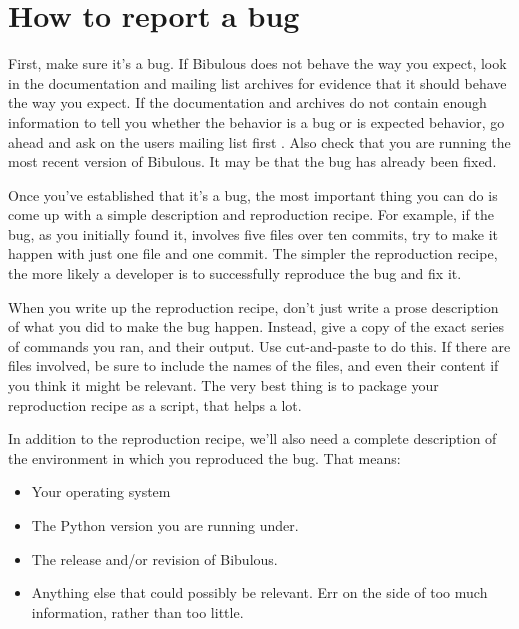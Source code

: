\documentclass[letterpaper,10pt,english]{sphinxmanual}
\begin{document}
\section{How to report a bug}
\label{instructions_for_reporting_bugs:how-to-report-a-bug}
First, make sure it's a bug. If Bibulous does not behave the way you expect, look in the documentation and mailing list archives for evidence that it should behave the way you expect. If the documentation and archives do not contain enough information to tell you whether the behavior is a bug or is expected behavior, go ahead and ask on the users mailing list first . Also check that you are running the most recent version of Bibulous. It may be that the bug has already been fixed.

Once you've established that it's a bug, the most important thing you can do is come up with a simple description and reproduction recipe. For example, if the bug, as you initially found it, involves five files over ten commits, try to make it happen with just one file and one commit. The simpler the reproduction recipe, the more likely a developer is to successfully reproduce the bug and fix it.

When you write up the reproduction recipe, don't just write a prose description of what you did to make the bug happen. Instead, give a copy of the exact series of commands you ran, and their output. Use cut-and-paste to do this. If there are files involved, be sure to include the names of the files, and even their content if you think it might be relevant. The very best thing is to package your reproduction recipe as a script, that helps a lot.

In addition to the reproduction recipe, we'll also need a complete description of the environment in which you reproduced the bug. That means:
\begin{itemize}
\item {} 
Your operating system

\item {} 
The Python version you are running under.

\item {} 
The release and/or revision of Bibulous.

\item {} 
Anything else that could possibly be relevant. Err on the side of too much information, rather than too little.

\end{itemize}
\end{document}
